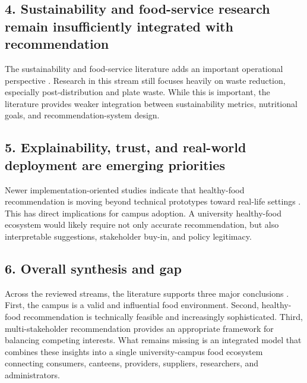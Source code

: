 \subsection{4. Sustainability and food-service research remain
insufficiently integrated with
recommendation}\label{sustainability-and-food-service-research-remain-insufficiently-integrated-with-recommendation}

The sustainability and food-service literature adds an important
operational perspective
\citep{peixoto2026sustainability, guimaraes2024waste}. Research in this
stream still focuses heavily on waste reduction, especially
post-distribution and plate waste. While this is important, the
literature provides weaker integration between sustainability metrics,
nutritional goals, and recommendation-system design.

\subsection{5. Explainability, trust, and real-world deployment are
emerging
priorities}\label{explainability-trust-and-real-world-deployment-are-emerging-priorities}

Newer implementation-oriented studies indicate that healthy-food
recommendation is moving beyond technical prototypes toward real-life
settings
\citep{workplace2025explanation, wang2024hypergraph, rostami2024group}.
This has direct implications for campus adoption. A university
healthy-food ecosystem would likely require not only accurate
recommendation, but also interpretable suggestions, stakeholder buy-in,
and policy legitimacy.

\subsection{6. Overall synthesis and
gap}\label{overall-synthesis-and-gap}

Across the reviewed streams, the literature supports three major
conclusions
\citep{bondevik2024, caruso2025campus, zheng2017msr, peixoto2026sustainability}.
First, the campus is a valid and influential food environment. Second,
healthy-food recommendation is technically feasible and increasingly
sophisticated. Third, multi-stakeholder recommendation provides an
appropriate framework for balancing competing interests. What remains
missing is an integrated model that combines these insights into a
single university-campus food ecosystem connecting consumers, canteens,
providers, suppliers, researchers, and administrators.

